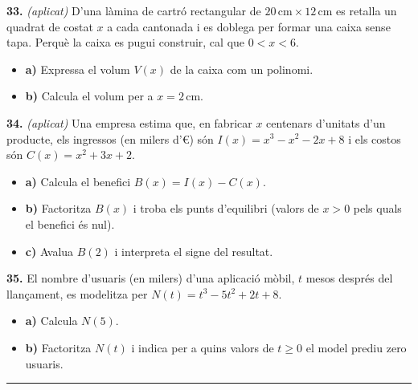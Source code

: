 \documentclass[13pt,a4paper]{extarticle}
\begin{document}
\par\noindent\begin{minipage}{\linewidth}
\textbf{33.} \emph{(aplicat)} D'una làmina de cartró rectangular de $20\,\text{cm}\times12\,\text{cm}$ es retalla un quadrat de costat $x$ a cada cantonada i es doblega per formar una caixa sense tapa. Perquè la caixa es pugui construir, cal que $0<x<6$.\par

\begin{itemize}[leftmargin=0pt,itemsep=3pt,topsep=3pt,parsep=0pt,label={}]
\item \textbf{a)} Expressa el volum $V(x)$ de la caixa com un polinomi.
\item \textbf{b)} Calcula el volum per a $x=2\,\text{cm}$.
\end{itemize}
\end{minipage}\par\vspace{1.6mm}
\par\noindent\begin{minipage}{\linewidth}
\textbf{34.} \emph{(aplicat)} Una empresa estima que, en fabricar $x$ centenars d'unitats d'un producte, els ingressos (en milers d'€) són $I(x)=x^3-x^2-2x+8$ i els costos són $C(x)=x^2+3x+2$.\par

\begin{itemize}[leftmargin=0pt,itemsep=3pt,topsep=3pt,parsep=0pt,label={}]
\item \textbf{a)} Calcula el benefici $B(x)=I(x)-C(x)$.
\item \textbf{b)} Factoritza $B(x)$ i troba els punts d'equilibri (valors de $x>0$ pels quals el benefici és nul).
\item \textbf{c)} Avalua $B(2)$ i interpreta el signe del resultat.
\end{itemize}
\end{minipage}\par\vspace{1.6mm}
\par\noindent\begin{minipage}{\linewidth}
\textbf{35.} El nombre d'usuaris (en milers) d'una aplicació mòbil, $t$ mesos després del llançament, es modelitza per $N(t)=t^3-5t^2+2t+8$.\par

\begin{itemize}[leftmargin=0pt,itemsep=3pt,topsep=3pt,parsep=0pt,label={}]
\item \textbf{a)} Calcula $N(5)$.
\item \textbf{b)} Factoritza $N(t)$ i indica per a quins valors de $t\geq0$ el model prediu zero usuaris.
\end{itemize}
\end{minipage}\par\vspace{1.6mm}
\vspace{1mm}\hrule\vspace{3mm}
\end{document}
